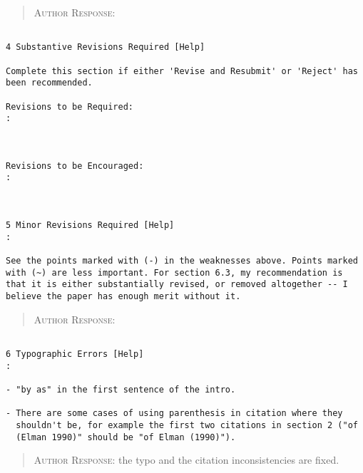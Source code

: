\begin{quote}
\textsc{Author Response:}  
\end{quote}
\begin{verbatim}

4 Substantive Revisions Required [Help]

Complete this section if either 'Revise and Resubmit' or 'Reject' has
been recommended.

Revisions to be Required:
: 



Revisions to be Encouraged:
: 



5 Minor Revisions Required [Help]
:

See the points marked with (-) in the weaknesses above. Points marked
with (~) are less important. For section 6.3, my recommendation is
that it is either substantially revised, or removed altogether -- I
believe the paper has enough merit without it.

\end{verbatim}  
\begin{quote}
\textsc{Author Response:}  
\end{quote}
\begin{verbatim}

6 Typographic Errors [Help]
:

- "by as" in the first sentence of the intro.

- There are some cases of using parenthesis in citation where they
  shouldn't be, for example the first two citations in section 2 ("of
  (Elman 1990)" should be "of Elman (1990)").

\end{verbatim}  
\begin{quote}
\textsc{Author Response:} the typo and the citation inconsistencies are fixed.
\end{quote}
